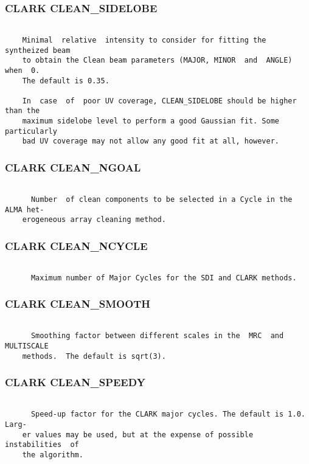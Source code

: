 \subsubsection{CLARK CLEAN\_SIDELOBE}
\begin{verbatim}

    Minimal  relative  intensity to consider for fitting the syntheized beam
    to obtain the Clean beam parameters (MAJOR, MINOR  and  ANGLE)  when  0.
    The default is 0.35.

    In  case  of  poor UV coverage, CLEAN_SIDELOBE should be higher than the
    maximum sidelobe level to perform a good Gaussian fit. Some particularly
    bad UV coverage may not allow any good fit at all, however.

\end{verbatim}
\subsubsection{CLARK CLEAN\_NGOAL}
\begin{verbatim}

      Number  of clean components to be selected in a Cycle in the ALMA het-
    erogeneous array cleaning method.

\end{verbatim}
\subsubsection{CLARK CLEAN\_NCYCLE}
\begin{verbatim}

      Maximum number of Major Cycles for the SDI and CLARK methods.

\end{verbatim}
\subsubsection{CLARK CLEAN\_SMOOTH}
\begin{verbatim}

      Smoothing factor between different scales in the  MRC  and  MULTISCALE
    methods.  The default is sqrt(3).

\end{verbatim}
\subsubsection{CLARK CLEAN\_SPEEDY}
\begin{verbatim}

      Speed-up factor for the CLARK major cycles. The default is 1.0.  Larg-
    er values may be used, but at the expense of possible  instabilities  of
    the algorithm.

\end{verbatim}
